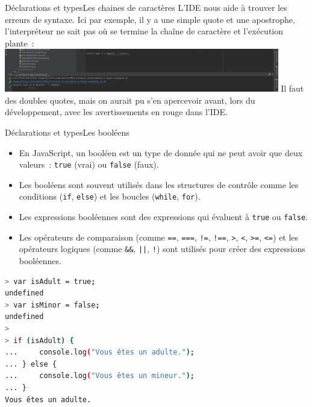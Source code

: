 \documentclass{beamer}
\begin{document}
    \begin{frame}{Déclarations et types}{Les chaines de caractères}
        L'IDE nous aide à trouver les erreurs de syntaxe.
        \bigbreak
        Ici par exemple, il y a une simple quote et une apostrophe, l'interpréteur ne sait pas où se termine la chaîne de caractère et l'exécution plante~:
        \bigbreak
        \centering
        \includegraphics[width=12cm]{image/wrong-quote}
        \pause
        \bigbreak
        \flushleft
        Il faut des doubles quotes, mais on aurait pu s'en apercevoir avant, lors du développement, avec les avertissements en rouge dans l'IDE.
    \end{frame}

    \begin{frame}[fragile]{Déclarations et types}{Les booléens}
        \begin{footnotesize}
            \begin{itemize}
                \item En JavaScript, un booléen est un type de donnée qui ne peut avoir que deux valeurs~: \lstinline{true} (vrai) ou \lstinline{false} (faux).
                \item Les booléens sont souvent utilisés dans les structures de contrôle comme les conditions (\lstinline{if}, \lstinline{else}) et les boucles (\lstinline{while}, \lstinline{for}).
                \item Les expressions booléennes sont des expressions qui évaluent à \lstinline{true} ou \lstinline{false}.
                \item Les opérateurs de comparaison (comme \lstinline{==}, \lstinline{===}, \lstinline{!=}, \lstinline{!==}, \lstinline{>}, \lstinline{<}, \lstinline{>=}, \lstinline{<=}) et les opérateurs logiques (comme \lstinline{&&}, \lstinline{||}, \lstinline{!}) sont utilisés pour créer des expressions booléennes.
            \end{itemize}
        \end{footnotesize}
        \begin{lstlisting}[language=Bash]
> var isAdult = true;
undefined
> var isMinor = false;
undefined
>
> if (isAdult) {
...     console.log("Vous êtes un adulte.");
... } else {
...     console.log("Vous êtes un mineur.");
... }
Vous êtes un adulte.
        \end{lstlisting}
    \end{frame}
\end{document}
